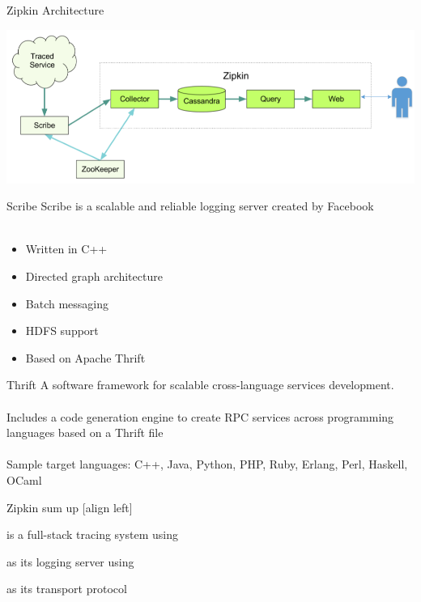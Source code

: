 \begin{frame}{Zipkin Architecture}
\begin{center}
    \includegraphics[scale=0.35]{images/zipkin-architecture.png} \\
\end{center}
\end{frame}

\begin{frame}{Scribe}
Scribe is a scalable and reliable logging server created by Facebook
\hfill \\
\hfill \\
\begin{itemize}
\item Written in C++
\item Directed graph architecture
\item Batch messaging
\item HDFS support
\item Based on Apache Thrift
\end{itemize}
\end{frame}

\begin{frame}{Thrift}
A software framework for scalable cross-language services development.
\hfill \\
\hfill \\
Includes a code generation engine to create RPC services across programming
languages based on a Thrift file
\hfill \\
\hfill \\
Sample target languages: C++, Java, Python, PHP, Ruby, Erlang, Perl, Haskell,
OCaml
\end{frame}

\begin{frame}{Zipkin sum up}
[align left]
\begin{description} \itemsep15pt
\item[Zipkin] is a full-stack tracing system using
\item[Scribe] as its logging server using
\item[Thrift] as its transport protocol
\end{description}
\end{frame}

